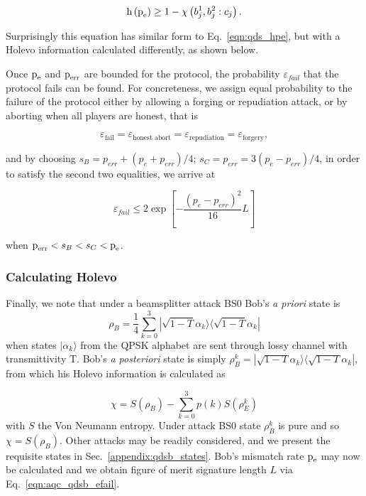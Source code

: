 \begin{equation}
\text{h}\left(\text{p}_{\text{e}}\right) \ge 1 - \chi\left(b_j^1, b_j^2 : c_j\right).
\end{equation}

\noindent Surprisingly this equation has similar form to Eq.~\ref{eqn:qds_hpe}, but with a Holevo information calculated differently, as shown below. %


Once $\text{p}_{\text{e}}$ and $\text{p}_{\text{err}}$ are bounded for the protocol, the probability $\varepsilon_{fail}$ that the protocol fails can be found. For concreteness, we assign equal probability to the failure of the protocol either by allowing a forging or repudiation attack, or by aborting when all players are honest, that is

\begin{equation*}
\varepsilon_{\text{fail}} = \varepsilon_{\text{honest abort}} = \varepsilon_{\text{repudiation}} = \varepsilon_{\text{forgery}},
\end{equation*}

\noindent and by choosing $s_B = p_{err} + \left(p_e + p_{err}\right)/4$; $s_C = p_{err} = 3\left(p_e - p_{err}\right)/4$, in order to satisfy the second two equalities, we arrive at 

\begin{equation}\label{eqn:aqc_qdsb_efail}
\varepsilon_{fail} \le 2 \exp \left[ - \frac{\left( p_e - p_{err} \right)^2}{16} L \right]
\end{equation}

\noindent when $\text{p}_{\text{err}}< s_B < s_C < \text{p}_{\text{e}}$.

\subsubsection{Calculating Holevo}

Finally, we note that under a beamsplitter attack BS$0$ Bob's \emph{a priori} state is
\begin{equation}\label{eqn:qdsb_apriori_state}
\rho_B = \frac{1}{4}\sum_{k=0}^3 |\sqrt{1-T}\alpha_k\rangle\langle\sqrt{1-T}\alpha_k|
\end{equation}
when states $|\alpha_k\rangle$ from the QPSK alphabet are sent through lossy channel with transmittivity T. Bob's \emph{a posteriori} state is simply $\rho_{B}^k = |\sqrt{1-T}\alpha_k\rangle\langle \sqrt{1-T}\alpha_k|$, from which his Holevo information is calculated as

\begin{equation}
\chi = S\left(\rho_B\right) - \sum_{k=0}^3 p\left(k\right) S\left(\rho_E^k\right)
\end{equation}
with $S$ the Von Neumann entropy. Under attack BS$0$ state $\rho_B^k$ is pure and so $\chi = S\left(\rho_B\right)$. Other attacks may be readily considered, and we present the requisite states in Sec.~\ref{appendix:qdsb_states}.  Bob's mismatch rate $\text{p}_{\text{e}}$ may now be calculated and we obtain figure of merit signature length $L$ via Eq.~\ref{eqn:aqc_qdsb_efail}.



